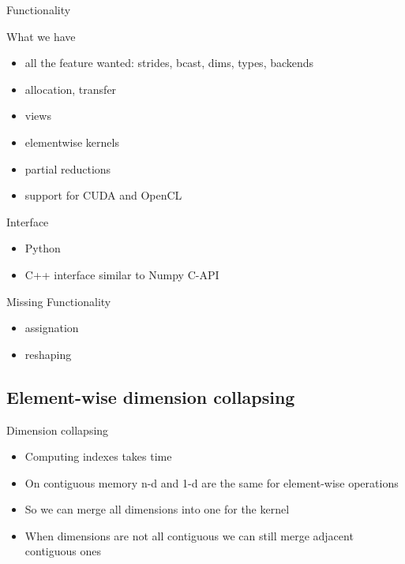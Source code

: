 \documentclass[utf8x,xcolor=pdftex,dvipsnames,table]{beamer}
\begin{document}
\begin{frame}{Functionality}
\begin{block}{What we have}
\begin{itemize}
\item all the feature wanted: strides, bcast, dims, types, backends
\item allocation, transfer
\item views
\item elementwise kernels
\item partial reductions
\item support for CUDA and OpenCL
\end{itemize}
\end{block}
\begin{block}{Interface}
\begin{itemize}
\item Python
\item C++ interface similar to Numpy C-API
\end{itemize}
\end{block}
\end{frame}

\begin{frame}{Missing Functionality}
\begin{itemize}
\item assignation
\item reshaping
\end{itemize}
\end{frame}

\subsection{Element-wise dimension collapsing}
\begin{frame}{Dimension collapsing}
\begin{itemize}
\item Computing indexes takes time
\item On contiguous memory n-d and 1-d are the same for element-wise operations
\item So we can merge all dimensions into one for the kernel
\item When dimensions are not all contiguous we can still merge adjacent contiguous ones
\end{itemize}
\end{frame}
\end{document}
